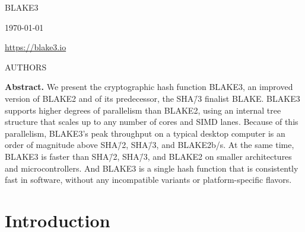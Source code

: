 \documentclass[11pt,notitlepage,a4paper]{article}
\title{\name}
\newcommand{\name}{BLAKE3\xspace}
\begin{document}
\selectfont

\pagestyle{plain}

\begin{center}
{\huge \name}

\bigskip

\mydate\today 

\medskip

\url{https://blake3.io}

\medskip

AUTHORS
\end{center}


\medskip

\begin{center}
  \begin{minipage}{0.92\linewidth}

      \textbf{Abstract.} We present the cryptographic hash function BLAKE3, an
      improved version of BLAKE2 and of its predecessor, the SHA\=/3 finalist
      BLAKE. BLAKE3 supports higher degrees of parallelism than BLAKE2, using
      an internal tree structure that scales up to any number of cores and SIMD
      lanes. Because of this parallelism, BLAKE3's peak throughput on a typical
      desktop computer is an order of magnitude above SHA\=/2, SHA\=/3, and
      BLAKE2b/s. At the same time, BLAKE3 is faster than SHA\=/2, SHA\=/3, and
      BLAKE2 on smaller architectures and microcontrollers. And BLAKE3 is a
      single hash function that is consistently fast in software, without any
      incompatible variants or platform-specific flavors.

   \end{minipage}
\end{center}

\smallskip

\section{Introduction}\label{sec:intro}
\end{document}
